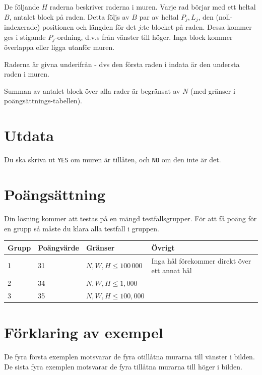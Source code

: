 De följande $H$ raderna beskriver raderna i muren.
Varje rad börjar med ett heltal $B$, antalet block på raden.
Detta följs av $B$ par av heltal $P_j, L_j$, den (noll-indexerade) positionen och längden för det $j$:te blocket på raden. Dessa kommer ges i stigande $P_j$-ordning, d.v.s från vänster till höger.
Inga block kommer överlappa eller ligga utanför muren.

Raderna är givna underifrån - dvs den första raden i indata är den understa raden i muren.

Summan av antalet block över alla rader är begränsat av $N$ (med gränser i poängsättnings-tabellen).

\section*{Utdata}
Du ska skriva ut \texttt{YES} om muren är tillåten, och \texttt{NO} om den inte är det.

\section*{Poängsättning}
Din lösning kommer att testas på en mängd testfallsgrupper. För att få poäng för en grupp
så måste du klara alla testfall i gruppen.

\begin{tabular}{| l | l | l | l |}
\hline
Grupp & Poängvärde & Gränser & Övrigt \\ \hline
1     & 31         & $N, W, H \le 100\,000$ & Inga hål förekommer direkt över ett annat hål \\ \hline
2     & 34         & $N, W, H \le 1,000$ & \\ \hline
3     & 35         & $N, W, H \le 100,000$ & \\ \hline
\end{tabular}

\section*{Förklaring av exempel}
De fyra första exemplen motsvarar de fyra otillåtna murarna till vänster i bilden.
De sista fyra exemplen motsvarar de fyra tillåtna murarna till höger i bilden.
